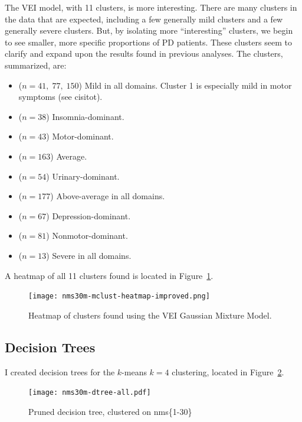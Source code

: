 \documentclass[10pt]{article}
\begin{document}
\begin{multicols}{2}
The VEI model, with 11 clusters, is more interesting. There are many clusters in the data that are
expected, including a few generally mild clusters and a few generally severe clusters.  But, by
isolating more ``interesting'' clusters, we begin to see smaller, more specific proportions of PD
patients. These clusters seem to clarify and expand upon the results found in previous analyses.
The clusters, summarized, are:

\begin{itemize}
  \item[1-3.] ($n = 41,\; 77,\; 150$) Mild in all domains. Cluster 1 is especially mild in motor
    symptoms (see cisitot).
  \item[4.] ($n = 38$) Insomnia-dominant.
  \item[5.] ($n = 43$) Motor-dominant.
  \item[6.] ($n = 163$) Average.
  \item[7.] ($n = 54$) Urinary-dominant.
  \item[8.] ($n = 177$) Above-average in all domains.
  \item[9.] ($n = 67$) Depression-dominant.
  \item[10.] ($n = 81$) Nonmotor-dominant.
  \item[11.] ($n = 13$) Severe in all domains.
\end{itemize}

A heatmap of all 11 clusters found is located in Figure~\ref{fig:nms30m-mclust-heatmap-improved}.

\begin{figure}[p]
  \centering
  \texttt{[image: nms30m-mclust-heatmap-improved.png]}
  \caption{Heatmap of clusters found using the VEI Gaussian Mixture Model.}
  \label{fig:nms30m-mclust-heatmap-improved}
\end{figure}

\subsection{Decision Trees}

I created decision trees for the $k$-means $k = 4$ clustering, located in
Figure~\ref{fig:nms30m-dtree-all}.

\begin{figure}[p]
  \centering
  \texttt{[image: nms30m-dtree-all.pdf]}
  \caption{Pruned decision tree, clustered on nms\{1-30\}}
  \label{fig:nms30m-dtree-all}
\end{figure}


\end{multicols}
\end{document}

